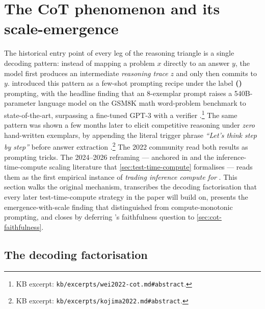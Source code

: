 
\section{The CoT phenomenon and its scale-emergence}
\label{sec:cot-phenomenon}

The historical entry point of every leg of the reasoning triangle is a
single decoding pattern: instead of mapping a problem $x$ directly to an
answer $y$, the model first produces an intermediate \emph{reasoning
trace} $z$ and only then commits to $y$. \citet{wei2022-cot} introduced
this pattern as a few-shot prompting recipe under the label
\textbf{ ()} prompting, with the headline finding
that an 8-exemplar  prompt raises a 540B-parameter language model on
the GSM8K math word-problem benchmark to state-of-the-art, surpassing a
fine-tuned GPT-3 with a verifier
\citep[abstract]{wei2022-cot}.\footnote{KB excerpt:
\nolinkurl{kb/excerpts/wei2022-cot.md#abstract}.} The same pattern was
shown a few months later to elicit competitive reasoning under
\emph{zero} hand-written exemplars, by appending the literal trigger
phrase \emph{``Let's think step by step''} before answer extraction
\citep[abstract]{kojima2022}.\footnote{KB excerpt:
\nolinkurl{kb/excerpts/kojima2022.md#abstract}.} The 2022 community read
both results as prompting tricks. The 2024--2026 reframing — anchored
in \citet{snell2024} and the inference-time-compute scaling literature
that \cref{sec:test-time-compute} formalises — reads them as the first
empirical instance of \emph{trading inference compute for }.
This section walks the original mechanism, transcribes the decoding
factorisation that every later test-time-compute strategy in the paper
will build on, presents the emergence-with-scale finding that
distinguished  from compute-monotonic prompting, and closes by
deferring 's faithfulness question to \cref{sec:cot-faithfulness}.

\subsection{The decoding factorisation}
\label{sec:cot-decoding}

